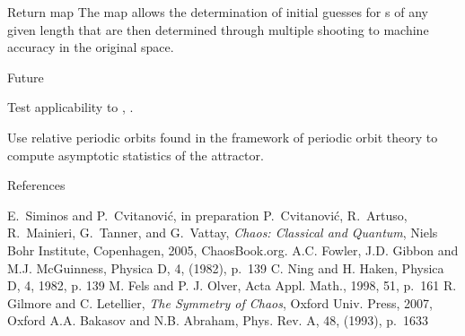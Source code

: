 \documentclass{theo1poster}[2003/04/25]
\renewcommand{\labelitemi}{\ding{228}}
\renewenvironment{itemize}%
 {\begin{list}{\labelitemi}%
       {%
        \setlength{\leftmargin}{0pt}%
        \setlength{\itemindent}{0pt}%
        \settowidth{\labelwidth}{\labelitemi}%
        \addtolength{\labelsep}{\itemindent}
        \addtolength{\leftmargin}{\labelwidth}%
        \addtolength{\leftmargin}{\labelsep}%
        \addtolength{\leftmargin}{-\itemindent}%
       }%
 }
 {\end{list}}
\begin{document}
\begin{poster}{4}
\begin{sheet}{Return map}
 The map allows the determination of initial guesses for \rpo s of any given
 length that are then determined through multiple shooting to machine accuracy 
 in the original space.

\end{sheet}

\begin{sheet}{Future}
\begin{itemize}
 \item Test applicability to \KSe, \PCf.
 \item Use relative periodic orbits found in the framework of periodic orbit theory\cite{DasBuch} to compute asymptotic statistics of the attractor.
\end{itemize}


\end{sheet}


\begin{sheet}{References}
\begin{thebibliography}{99}
	{\sc  E.~Siminos and P.~Cvitanovi\'c}, in preparation
{\sc P.~Cvitanovi\'{c}, R.~Artuso, R.~Mainieri, G.~Tanner, and G.~Vattay}, {\em
  Chaos: Classical and Quantum}, Niels Bohr Institute, Copenhagen, 2005,
  ChaosBook.org.
{\sc A.C. Fowler, J.D. Gibbon and M.J. McGuinness}, 
    Physica D, 4, (1982), p.~139
{\sc C. Ning and H. Haken},
    Physica D, 4, 1982, p. 139
  {\sc M. Fels and P. J. Olver}, Acta Appl. Math., 1998, 51,
  p.~161
  {\sc R. Gilmore and C. Letellier},
  \emph{The Symmetry of Chaos}, Oxford Univ. Press, 2007, Oxford
    {\sc A.A. Bakasov and N.B. Abraham},
    Phys. Rev. A, 48, (1993), p.~1633


\end{thebibliography}
\end{sheet}



\end{poster}
\end{document}
